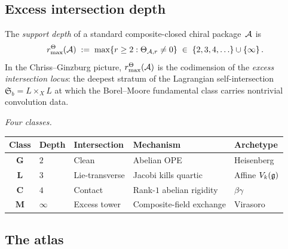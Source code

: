 \subsection{Excess intersection depth}%
\label{subsec:excess-intersection-depth}%

\begin{definition}%
\label{def:shadow-depth-intersection}%
%
The \emph{support depth} of a standard composite-closed chiral
package~$\mathcal{A}$ is
\[
 r^\Theta_{\max}(\mathcal{A})
 \;:=\;
 \max\{r \ge 2 : \Theta_{\mathcal{A},r} \ne 0\}
 \;\in\;
 \{2, 3, 4, \ldots\} \cup \{\infty\}\,.
\]
In the Chriss--Ginzburg picture, \(r^\Theta_{\max}(\mathcal{A})\) is the codimension
of the \emph{excess intersection locus}: the deepest stratum
of the Lagrangian self-intersection
$\mathfrak{S}_b = L\times_X L$ at which the Borel--Moore
fundamental class carries nontrivial convolution data.

\smallskip
\noindent
\emph{Four classes.}
\begin{center}
\small
\renewcommand{\arraystretch}{1.3}
\begin{tabular}{cllll}
\toprule
\textbf{Class} & \textbf{Depth} & \textbf{Intersection} &
\textbf{Mechanism} & \textbf{Archetype} \\
\midrule
$\mathbf{G}$ & $2$ & Clean &
 Abelian OPE & Heisenberg \\
$\mathbf{L}$ & $3$ & Lie-transverse &
 Jacobi kills quartic & Affine $V_k(\mathfrak{g})$ \\
$\mathbf{C}$ & $4$ & Contact &
 Rank-$1$ abelian rigidity & $\beta\gamma$ \\
$\mathbf{M}$ & $\infty$ & Excess tower &
 Composite-field exchange & Virasoro \\
\bottomrule
\end{tabular}
\end{center}
\end{definition}

\subsection{The atlas}%
\label{subsec:atlas}%

